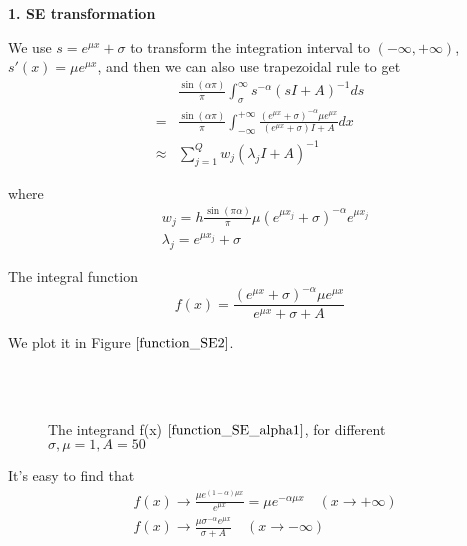 \textbf{1. SE transformation}

We use $s=e^{\mu x}+\sigma$  to transform the integration interval to $(-\infty,+\infty)$, $s'(x)=\mu e^{\mu x}$, and then we can also use trapezoidal rule to get
\begin{equation}
  \begin{aligned}
&\frac{\sin(\alpha \pi)}{\pi}\int_{\sigma}^{\infty}s^{-\alpha}(s{I}+{A})^{-1}ds\\
=&\frac{\sin(\alpha \pi)}{\pi}\int_{-\infty}^{+\infty}\frac{(e^{\mu x}+\sigma)^{-\alpha}\mu e^{\mu x}}{(e^{\mu x}+\sigma){I}+ {A}}dx\\
 \approx & \sum_{j=1}^{Q}w_j(\lambda_jI+A)^{-1}
  \end{aligned}
  \label{SE_2}
\end{equation}

where
\begin{equation}
\begin{aligned}
&w_j=h \frac{\sin(\pi \alpha)}{\pi}\mu (e^{\mu x_j}+\sigma)^{-\alpha}e^{\mu x_j}\\
&\lambda_j=e^{\mu x_j}+\sigma
\end{aligned}
\end{equation}

The integral function
\begin{equation}
f(x)=\frac{(e^{\mu x}+\sigma)^{-\alpha}\mu e^{\mu x}}{e^{\mu x}+\sigma+ {A}}
\label{function_SE_alpha1}
\end{equation}

We plot it in Figure $\ref{function_SE2}$.
\begin{figure}[htbp]
\centering
{}
~~
~~
\\
~~
~~
  \caption{The integrand f(x) $\eqref{function_SE_alpha1}$, for different $\sigma,\mu=1,A=50$}
  \label{function_SE2}
\end{figure}



It's easy to find that
\begin{equation}
\begin{aligned}
& f(x)\rightarrow \frac{\mu e^{(1-\alpha)\mu x}}{e^{\mu x}}=\mu e^{-\alpha \mu x}\quad (x \rightarrow +\infty)\\
& f(x)\rightarrow \frac{\mu \sigma^{-\alpha}e^{\mu x}}{\sigma+A}\quad (x \rightarrow -\infty)
\end{aligned}
\end{equation}

